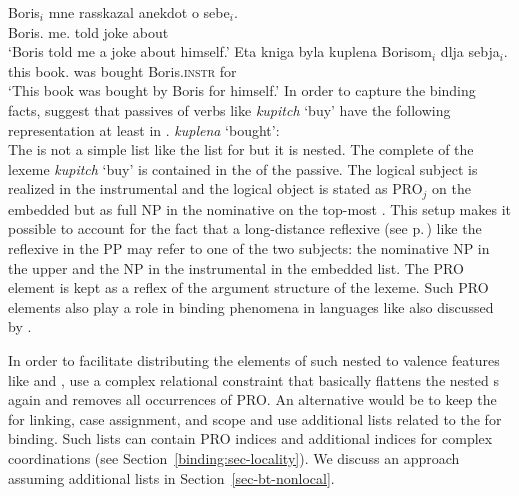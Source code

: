 \documentclass[output=paper
 	        ,biblatex
                ,babelshorthands
                ,newtxmath
                ,draftmode
                ,colorlinks, citecolor=brown
]{langscibook}
\begin{document}
\eal
\label{binding:russian-pass}
\ex  
\gll Boris$_i$    mne      rasskazal anekdot o sebe$_i$.\\
     Boris.\nom{} me.\dat{} told      joke    about \self\\
\glt `Boris told me a joke about himself.'
\ex
\gll Eta kniga byla kuplena Borisom$_{i}$ dlja sebja$_{i}$.  \\
     this book.\nom{} was bought Boris.\textsc{instr} for \self  \\
\glt `This book was bought by Boris for himself.'
\zl
In order to capture the binding facts, \citet{MS98a} suggest that passives of verbs like
\emph{kupitch} `buy' have the following representation at least in .
\ea
\emph{kuplena} `bought':\\
\z
The \argstl is not a simple list like the list for  but it is nested. The complete \argstl of
the lexeme \emph{kupitch} `buy' is contained in the \argstl of the passive. The logical subject is
realized in the instrumental and the logical object is stated as PRO$_j$ on the embedded \argst but
as full NP in the nominative on the top-most \argstl. This setup makes it possible to account for
the fact that a long-distance reflexive (see p.\,\pageref{page-long-distance-reflexives}) like the
reflexive in the PP may refer to one of the two subjects: the nominative NP in the upper \argstl and
the NP in the instrumental in the embedded list. The PRO element is kept as a reflex of the
argument structure of the lexeme. Such PRO elements also play a role in binding phenomena in languages
like  also discussed by \citeauthor{MS98a}.

In order to facilitate distributing the elements of such nested \argstls to valence features like
\subj and \comps, \citet[, 140]{MS98a} use a complex relational constraint that basically flattens the
nested \argst{}s again and removes all occurrences of PRO. An alternative would be to keep the
\argstl for linking, case assignment, and scope and use additional lists related to the \argstl for
binding. Such lists can contain PRO indices and additional indices for complex coordinations (see
Section~\ref{binding:sec-locality}). We discuss an approach assuming additional lists in Section~\ref{sec-bt-nonlocal}.
\end{document}
